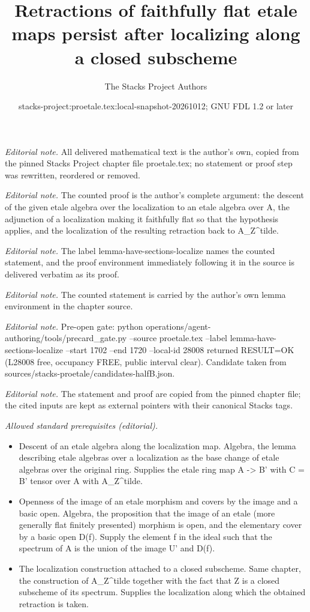 \documentclass[10pt,a4paper]{amsart}
\title{Retractions of faithfully flat etale maps persist after localizing along a closed subscheme}
\author{The Stacks Project Authors}
\date{stacks-project:proetale.tex:local-snapshot-20261012; GNU FDL 1.2 or later}
\theoremstyle{plain}
\theoremstyle{definition}
\theoremstyle{remark}
\numberwithin{equation}{subsection}
\begin{document}
\maketitle
\noindent\textit{Editorial note.} All delivered mathematical text is the author's own, copied from the pinned Stacks Project chapter file proetale.tex; no statement or proof step was rewritten, reordered or removed.\par\medskip
\noindent\textit{Editorial note.} The counted proof is the author's complete argument: the descent of the given etale algebra over the localization to an etale algebra over A, the adjunction of a localization making it faithfully flat so that the hypothesis applies, and the localization of the resulting retraction back to A\_Z\textasciicircum{}tilde.\par\medskip
\noindent\textit{Editorial note.} The label lemma-have-sections-localize names the counted statement, and the proof environment immediately following it in the source is delivered verbatim as its proof.\par\medskip
\noindent\textit{Editorial note.} The counted statement is carried by the author's own lemma environment in the chapter source.\par\medskip
\noindent\textit{Editorial note.} Pre-open gate: python operations/agent-authoring/tools/precard\_gate.py --source proetale.tex --label lemma-have-sections-localize --start 1702 --end 1720 --local-id 28008 returned RESULT=OK (L28008 free, occupancy FREE, public interval clear). Candidate taken from sources/stacks-proetale/candidates-halfB.json.\par\medskip
\noindent\textit{Editorial note.} The statement and proof are copied from the pinned chapter file; the cited inputs are kept as external pointers with their canonical Stacks tags.\par\medskip
\noindent\textit{Allowed standard prerequisites (editorial).}\begin{itemize}
\item Descent of an etale algebra along the localization map. Algebra, the lemma describing etale algebras over a localization as the base change of etale algebras over the original ring. Supplies the etale ring map A -> B' with C = B' tensor over A with A\_Z\textasciicircum{}tilde.
\item Openness of the image of an etale morphism and covers by the image and a basic open. Algebra, the proposition that the image of an etale (more generally flat finitely presented) morphism is open, and the elementary cover by a basic open D(f). Supply the element f in the ideal such that the spectrum of A is the union of the image U' and D(f).
\item The localization construction attached to a closed subscheme. Same chapter, the construction of A\_Z\textasciicircum{}tilde together with the fact that Z is a closed subscheme of its spectrum. Supplies the localization along which the obtained retraction is taken.
\end{itemize}\medskip
\end{document}
